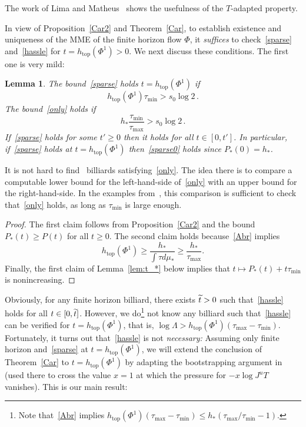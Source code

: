 \documentclass[10pt]{amsart}
\newtheorem{lemm}[theo]{Lemma}\newtheorem{prop}[theo]{Proposition}\newtheorem{coro}[theo]{Corollary}\newtheorem{conj}[theo]{Conjecture}
\theoremstyle{definition}\newtheorem{defi}[theo]{Definition}\newtheorem{rema}[theo]{Remark}\newtheorem{exam}[theo]{Example}\newtheorem{exem}[theo]{Example}\newtheorem{nota}[theo]{Notation}
\newcommand{\htop}{h_{\scriptstyle{\text{top}}}}
\let\oldtilde\tilde
\renewcommand*{\tilde}[1]{\mathchoice{\widetilde{#1}}{\widetilde{#1}}{\oldtilde{#1}}{\oldtilde{#1}}}
\begin{document}
The work of Lima and Matheus~\cite{LM} shows the usefulness of the $T$-adapted property.




In view of Proposition~\ref{Car2} and Theorem~\ref{Car}, to establish existence and uniqueness of the MME of the finite horizon flow $\Phi$, it \emph{suffices} to check~\eqref{sparse} and~\eqref{hassle} for $t=\htop(\Phi^1)>0$. We next discuss these conditions. The first one is very mild:

\begin{lemm}\label{mild}
The bound~\eqref{sparse} holds $t=\htop(\Phi^1)$ if
\begin{equation}\label{only}
\htop\left(\Phi^1\right) \tau_{\min}> s_0 \log 2 \,.
\end{equation}
The bound~\eqref{only} holds if
\begin{equation}\label{only'}
h_* \frac{\tau_{\min}}{\tau_{\max}} > s_0 \log 2\,.
\end{equation}
If~\eqref{sparse} holds for some $t'\ge 0$ then it holds for all $t\in [0,t']$. In particular, if~\eqref{sparse} holds at $t=\htop(\Phi^1)$ then~\eqref{sparse0} holds since $P_*(0)=h_*$.
\end{lemm}

It is not hard to find~\cite[Remark~5.6]{Ca} billiards satisfying~\eqref{only}. The idea there is to compare a computable lower bound for the left-hand-side of~\eqref{only} with an upper bound for the right-hand-side. In the examples from~\cite[\S~2.4]{BD1}, this comparison is sufficient to check that~\eqref{only} holds, as long as $\tau_{\min}$ is large enough.

\begin{proof}
The first claim follows from Proposition~\ref{Car2} and the bound $P_*(t)\ge P(t)$ for all $t\ge 0$. The second claim holds because~\eqref{Abr} implies
\[
\htop\left(\Phi^1\right)\ge \frac{h_*}{\int \tau d\mu_*} \ge \frac{h_*}{\tau_{\max}}.
\]
Finally, the first claim of Lemma~\ref{lem:t_*} below implies that $t\mapsto P_*(t)+t\tau_{\min}$ is nonincreasing.
\end{proof}



Obviously, for any finite horizon billiard, there exists $\tilde t>0$ such that~\eqref{hassle} holds for all $t\in[0, \tilde t]$. However, we do\footnote{Note that~\eqref{Abr} implies $\htop(\Phi^1) (\tau_{\max}-\tau_{\min}) \le h_* (\tau_{\max}/\tau_{\min}-1)$.} not know any billiard such that~\eqref{hassle} can be verified for $t=\htop(\Phi^1)$, that is, $
\log \Lambda > \htop(\Phi^1) (\tau_{\max}-\tau_{\min})$. Fortunately, it turns out that~\eqref{hassle} is not \emph{necessary:} Assuming only finite horizon and~\eqref{sparse} at $t=\htop(\Phi^1)$, we will extend the conclusion of Theorem~\ref{Car} to $t=\htop(\Phi^1)$ by adapting the bootstrapping argument in~\cite[Lemma~3.10]{BD2} (used there to cross the value $x=1$ at which the pressure for $-x\log J^u T$ vanishes). This is our main result:
\end{document}
